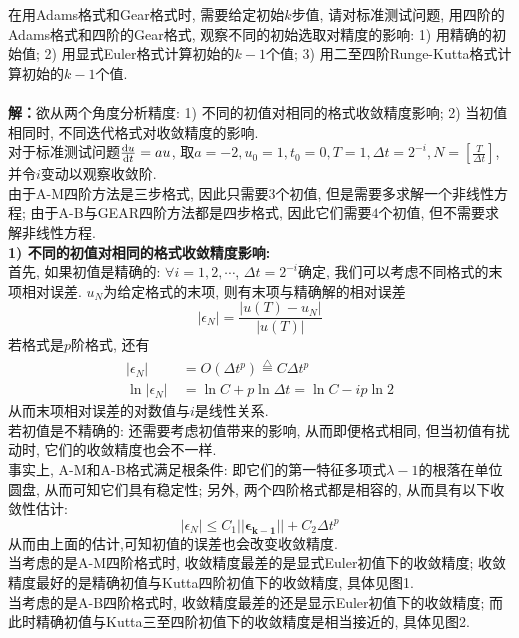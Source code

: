 \documentclass[12pt]{article}
\begin{document}
\noindent 在用Adams格式和Gear格式时, 需要给定初始$k$步值, 请对标准测试问题, 用四阶的Adams格式和四阶的Gear格式, 观察不同的初始选取对精度的影响: 1) 用精确的初始值; 2) 用显式Euler格式计算初始的$k-1$个值; 3) 用二至四阶Runge-Kutta格式计算初始的$k-1$个值.\\
\\
\textbf{解：}欲从两个角度分析精度: 1) 不同的初值对相同的格式收敛精度影响; 2) 当初值相同时, 不同迭代格式对收敛精度的影响.\\
对于标准测试问题$\frac{{\rm d}u}{{\rm d}t}=au$, 取$a=-2, u_0=1, t_0=0, T=1, \Delta{t}=2^{-i}, N=[\frac{T}{\Delta{t}}]$, 并令$i$变动以观察收敛阶.\\
由于A-M四阶方法是三步格式, 因此只需要$3$个初值, 但是需要多求解一个非线性方程; 由于A-B与GEAR四阶方法都是四步格式, 因此它们需要$4$个初值, 但不需要求解非线性方程.\\
\textbf{1) 不同的初值对相同的格式收敛精度影响: }\\
首先, 如果初值是精确的: $\forall i=1,2,\cdots$, $\Delta{t}=2^{-i}$确定, 我们可以考虑不同格式的末项相对误差. $u_{N}$为给定格式的末项, 则有末项与精确解的相对误差$$\vert \epsilon_N \vert=\frac{\vert u(T)-u_N\vert}{\vert u(T)\vert}$$
\noindent 若格式是$p$阶格式, 还有
\begin{align*}
	\vert \epsilon_N \vert &= O(\Delta{t}^p)\overset{\triangle}{=}C\Delta{t}^p\\
	\ln \vert \epsilon_N \vert \ &= \ln C + p\ln\Delta{t}=\ln C - ip\ln2
\end{align*}
\noindent 从而末项相对误差的对数值与$i$是线性关系.\\
若初值是不精确的: 还需要考虑初值带来的影响, 从而即便格式相同, 但当初值有扰动时, 它们的收敛精度也会不一样.\\
事实上, A-M和A-B格式满足根条件: 即它们的第一特征多项式$\lambda -1 $的根落在单位圆盘, 从而可知它们具有稳定性; 另外, 两个四阶格式都是相容的, 从而具有以下收敛性估计:$$\vert  \epsilon_N\vert \le C_1\vert \vert \bm{\epsilon_{k-1}}\vert \vert+C_2\Delta{t}^p$$
\noindent 从而由上面的估计,可知初值的误差也会改变收敛精度.\\
\noindent 当考虑的是A-M四阶格式时, 收敛精度最差的是显式Euler初值下的收敛精度; 收敛精度最好的是精确初值与Kutta四阶初值下的收敛精度, 具体见图1. \\
当考虑的是A-B四阶格式时, 收敛精度最差的还是显示Euler初值下的收敛精度; 而此时精确初值与Kutta三至四阶初值下的收敛精度是相当接近的, 具体见图2.
\end{document}
